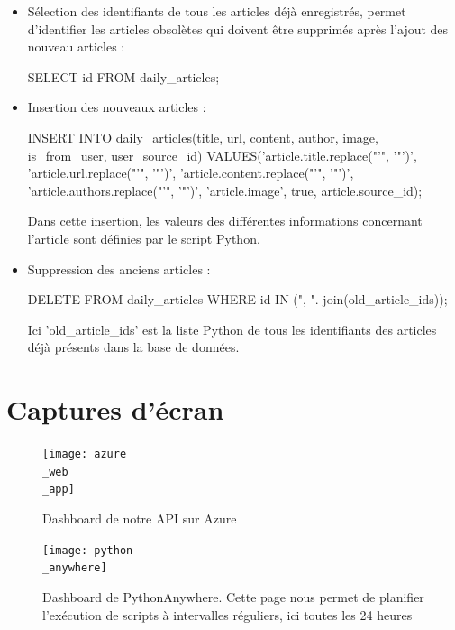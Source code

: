 \documentclass[french]{article}
\begin{document}
\begin{itemize}
        \begin{itemize}
            \item Sélection des identifiants de tous les articles déjà enregistrés, permet d'identifier les articles obsolètes qui doivent être supprimés après l'ajout des nouveau articles :
            \begin{spverbatim}
            SELECT id FROM daily_articles;
            \end{spverbatim}
            \item Insertion des nouveaux articles :
            \begin{spverbatim}
            INSERT INTO daily_articles(title, url, content, author, image, is_from_user, user_source_id) VALUES('{article.title.replace("'", '"')}', '{article.url.replace("'", '"')}', '{article.content.replace("'", '"')}', '{article.authors.replace("'", '"')}', '{article.image}', true, {article.source_id});
            \end{spverbatim}
            Dans cette insertion, les valeurs des différentes informations concernant l'article sont définies par le script Python.
            \item Suppression des anciens articles :
            \begin{spverbatim}
            DELETE FROM daily_articles WHERE id IN ({", ". join(old_article_ids)});
            \end{spverbatim}
            Ici 'old\_article\_ids' est la liste Python de tous les identifiants des articles déjà présents dans la base de données.
        \end{itemize}
    \end{itemize}



    \section*{Captures d'écran}
    \begin{figure}[h]
        \texttt{[image: azure\\\_web\\\_app]}
        \centering
        \caption{Dashboard de notre API sur Azure}
        \centering
    \end{figure}
    \begin{figure}[h]
        \texttt{[image: python\\\_anywhere]}
        \centering
        \caption{Dashboard de PythonAnywhere. Cette page nous permet de planifier l'exécution de scripts à intervalles réguliers, ici toutes les 24 heures}
        \centering
    \end{figure}
\end{document}
